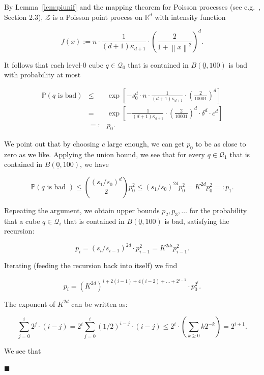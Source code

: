\documentclass[11pt]{article}%
\newenvironment{proof}{\vspace{1ex}\noindent{\bf Proof.}}{\hspace*{\fill}$\blacksquare$\vspace{1ex}}
\newcommand{\Qcal}[0]{\ensuremath{{\mathcal Q}}}
\newcommand{\Zcal}[0]{\ensuremath{{\mathcal Z}}}
\newcommand{\eR}[0]{\ensuremath{ \mathbb R}}
\newcommand{\norm}[1]{\ensuremath{\left\|#1\right\|}}
\newcommand{\Pee}[0]{\ensuremath{{\mathbb P}}}
\newcommand{\orig}{\underline{0}}
\begin{document}
\begin{proof}
By Lemma~\ref{lem:piunif} and the mapping theorem for Poisson processes 
(see e.g.~\cite{Kingmanboek}, Section 2.3), $\Zcal$ is a Poisson point process on $\eR^d$ with intensity function 

$$ f(x) := n \cdot  \frac{1}{(d+1)\kappa_{d+1}} \cdot \left(\frac{2}{1+\norm{x}^2}\right)^d. $$

\noindent 
It follows that each level-0 cube $q \in \Qcal_0$ that is contained in $B(\orig,100)$
is bad with probability at most

\begin{equation}\label{eq:aap}\begin{array}{rcl} 
\Pee(\text{$q$ is bad} ) 
& \leq & %
\exp\left[ -s_0^d \cdot n  \cdot \frac{1}{(d+1)\kappa_{d+1}} \cdot \left(\frac{2}{10001}\right)^d \right] \\[2ex]
& = & %
\exp\left[ -  \frac{1}{(d+1)\kappa_{d+1}} \cdot \left(\frac{2}{10001}\right)^d \cdot \delta^d \cdot c^d\right] \\
& =: & p_0. 
\end{array} 
\end{equation}

\noindent
We point out that by choosing $c$ large enough, we can get $p_0$ to be as close to zero as we like.
Applying the union bound, we see that for every $q \in \Qcal_1$ that is contained in $B(\orig,100)$, we have 

$$ \Pee(\text{$q$ is bad }) \leq  {(s_1/s_0)^{d} \choose 2} p_0^2 \leq (s_1/s_0)^{2d} p_0^2
= K^{2d} p_0^2 =: p_1. $$

\noindent 
Repeating the argument, we obtain upper bounds $p_2,p_3,\dots$ for the probability that 
a cube $q \in \Qcal_i$ that is contained in $B(\orig,100)$ is bad, satisfying the recursion:

$$ p_i = \left(s_i/s_{i-1}\right)^{2d} \cdot p_{i-1}^2 = K^{2di} p_{i-1}^2. $$

\noindent
Iterating (feeding the recursion back into itself) we find

$$ p_i = \left(K^{2d}\right)^{i + 2(i-1) + 4(i-2) + \dots + 2^{i-1}} \cdot 
p_0^{2^i}. $$

\noindent
The exponent of $K^{2d}$ can be written as:

$$ \sum_{j=0}^i 2^j \cdot (i-j)
= 2^i \sum_{j=0}^i \left(1/2\right)^{i-j} \cdot (i-j)
\leq 2^i \cdot \left( \sum_{k\geq 0} k 2^{-k} \right) = 2^{i+1}. $$

\noindent 
We see that 


\end{proof}
\end{document}
